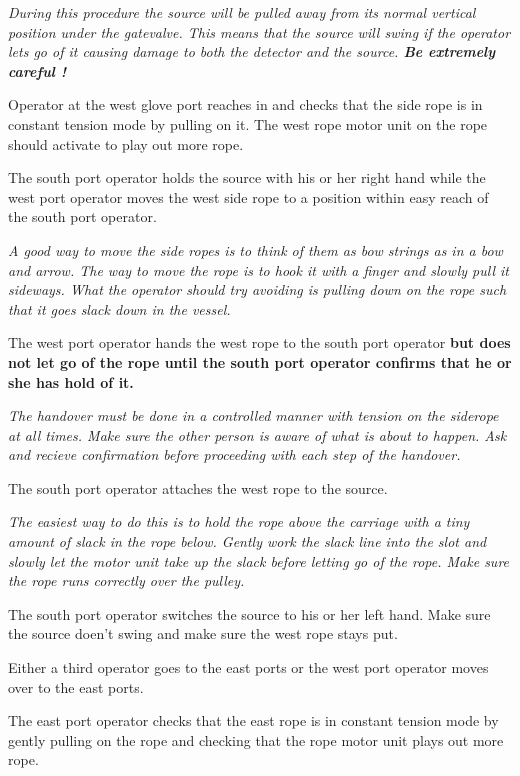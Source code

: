 \begin{enumerate}
\small
{\em 
    During this procedure the source will be pulled away from its normal
    vertical position under the gatevalve. This means that the source will swing
if the operator lets go of it causing damage to both the detector and the source.
 {\bf Be extremely careful !}
}
\normalsize

\checkitem Operator at the west glove port reaches in and checks that
  the side rope is in constant tension mode by pulling on it.  The
  west rope motor unit on the rope should activate to play out more 
  rope.


\checkitem  The south port operator holds the source with his or her right hand while 
the  west port operator moves the west side rope  to a position within
 easy reach of the south port operator.

  \small
  {\em
    A good way to move the side ropes is to think of them as
    bow strings as in a bow and arrow.  The way to move the rope
    is to hook it with a finger and slowly pull it sideways.  What
    the operator should try avoiding is pulling down on the rope
    such that it goes slack down in the vessel.
  }
  \normalsize
  
\checkitem The west port operator hands the west rope to the south port operator
{\bf but does not let go of the rope until the south port operator confirms
that he or she has hold of it.}

\small
{\em The handover must be done in a controlled manner with tension on the siderope at
all times. Make sure the other person
is aware of what is about to happen. Ask and recieve confirmation before proceeding
with each step of the handover. }
\normalsize

\checkitem The south port operator attaches the west rope to the source.

\small
{\em The easiest way to do this is to hold the rope above the carriage
with a tiny amount of slack in the rope below. Gently work the slack line into
the slot and slowly let the motor unit take up the slack before
letting go of the rope. Make sure the rope runs correctly over the pulley.
}
\normalsize


\checkitem The south port operator switches the source to his or her left
hand. Make sure the source doen't swing and make sure the west rope
stays put.

\checkitem Either a third operator goes to the east ports or the west
  port operator moves over to the east ports.


\checkitem The east port operator checks that the east rope is in
  constant tension mode by gently pulling on the rope and checking
  that the rope motor unit plays out more rope.


\end{enumerate}

